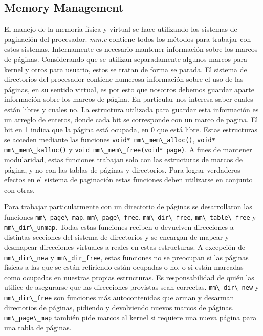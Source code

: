 \documentclass[a4paper]{article}
\newcommand{\file}[1]{\textit{#1}}
\newcommand{\func}[1]{\lstinline{#1}}
\begin{document}
\subsection{Memory Management}

El manejo de la memoria física y virtual se hace utilizando los sistemas de paginación del procesador. \file{mm.c} contiene todos los métodos para trabajar con estos sistemas. Internamente es necesario mantener información sobre los marcos de páginas. Considerando que se utilizan separadamente algunos marcos para kernel y otros para usuario, estos se tratan de forma se parada. El sistema de directorios del procesador contiene numerosa información sobre el uso de las páginas, en su sentido virtual, es por esto que nosotros debemos guardar aparte información sobre los marcos de página. En particular nos interesa saber cuales están libres y cuales no. La estructura utilizada para guardar esta información es un arreglo de enteros, donde cada bit se corresponde con un marco de pagina. El bit en 1 indica que la página está ocupada, en 0 que está libre. Estas estructuras se acceden mediante las funciones \func{void* mm\_mem\_alloc()}, \func{void* mm\_mem\_kalloc()} y \func{void mm\_mem\_free(void* page)}. A fines de mantener modularidad, estas funciones trabajan solo con las estructuras de marcos de página, y no con las tablas de páginas y directorios. Para lograr verdaderos efectos en el sistema de paginación estas funciones deben utilizarse en conjunto con otras.

Para trabajar particularmente con un directorio de páginas se desarrollaron las funciones \func{mm\_page\_map}, \func{mm\_page\_free}, \func{mm\_dir\_free}, \func{mm\_table\_free} y \func{mm\_dir\_unmap}. Todas estas funciones reciben o devuelven direcciones a distintas secciones del sistema de directorios y se encargan de mapear y desmapear direcciones virtuales a reales en estas estructuras. A excepción de \func{mm\_dir\_new} y \func{mm\_dir_free}, estas funciones no se preocupan si las páginas físicas a las que se están refiriendo están ocupadas o no, o si están marcadas como ocupadas en nuestras propias estructuras. Es responsabilidad de quién las utilice de asegurarse que las direcciones provistas sean correctas. \func{mm\_dir\_new} y \func{mm\_dir\_free} son funciones más autocontenidas que arman y desarman directorios de páginas, pidiendo y devolviendo nuevos marcos de páginas. \func{mm\_page\_map} también pide marcos al kernel si requiere una nueva página para una tabla de páginas. 
\end{document}
